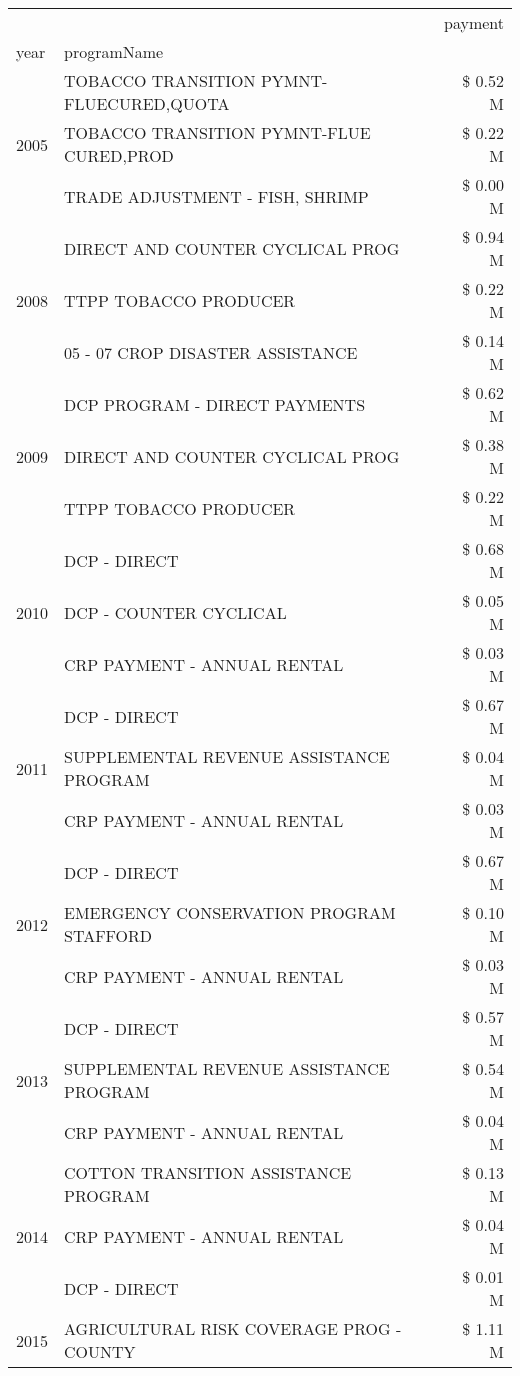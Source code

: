 \begin{tabular}{llr}
\toprule
 &  & payment \\
year & programName &  \\
\midrule
\multirow[t]{3}{*}{2005} & TOBACCO TRANSITION PYMNT-FLUECURED,QUOTA & \$ 0.52 M \\
 & TOBACCO TRANSITION PYMNT-FLUE CURED,PROD & \$ 0.22 M \\
 & TRADE ADJUSTMENT - FISH, SHRIMP & \$ 0.00 M \\
\cline{1-3}
\multirow[t]{3}{*}{2008} & DIRECT AND COUNTER CYCLICAL PROG & \$ 0.94 M \\
 & TTPP TOBACCO PRODUCER & \$ 0.22 M \\
 & 05 - 07 CROP DISASTER ASSISTANCE & \$ 0.14 M \\
\cline{1-3}
\multirow[t]{3}{*}{2009} & DCP PROGRAM - DIRECT PAYMENTS & \$ 0.62 M \\
 & DIRECT AND COUNTER CYCLICAL PROG & \$ 0.38 M \\
 & TTPP TOBACCO PRODUCER & \$ 0.22 M \\
\cline{1-3}
\multirow[t]{3}{*}{2010} & DCP - DIRECT & \$ 0.68 M \\
 & DCP - COUNTER CYCLICAL & \$ 0.05 M \\
 & CRP PAYMENT - ANNUAL RENTAL & \$ 0.03 M \\
\cline{1-3}
\multirow[t]{3}{*}{2011} & DCP - DIRECT & \$ 0.67 M \\
 & SUPPLEMENTAL REVENUE ASSISTANCE PROGRAM & \$ 0.04 M \\
 & CRP PAYMENT - ANNUAL RENTAL & \$ 0.03 M \\
\cline{1-3}
\multirow[t]{3}{*}{2012} & DCP - DIRECT & \$ 0.67 M \\
 & EMERGENCY CONSERVATION PROGRAM STAFFORD & \$ 0.10 M \\
 & CRP PAYMENT - ANNUAL RENTAL & \$ 0.03 M \\
\cline{1-3}
\multirow[t]{3}{*}{2013} & DCP - DIRECT & \$ 0.57 M \\
 & SUPPLEMENTAL REVENUE ASSISTANCE PROGRAM & \$ 0.54 M \\
 & CRP PAYMENT - ANNUAL RENTAL & \$ 0.04 M \\
\cline{1-3}
\multirow[t]{3}{*}{2014} & COTTON TRANSITION ASSISTANCE PROGRAM & \$ 0.13 M \\
 & CRP PAYMENT - ANNUAL RENTAL & \$ 0.04 M \\
 & DCP - DIRECT & \$ 0.01 M \\
\cline{1-3}
\multirow[t]{3}{*}{2015} & AGRICULTURAL RISK COVERAGE PROG - COUNTY & \$ 1.11 M \\

\end{tabular}
